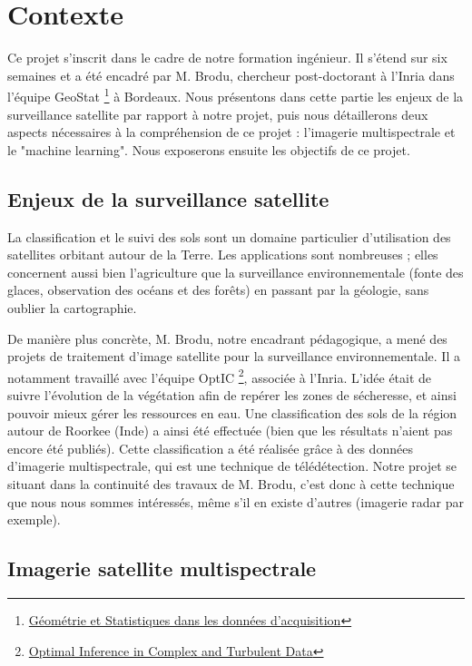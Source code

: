 
\section{Contexte}

Ce projet s'inscrit dans le cadre de notre formation ingénieur. Il s'étend sur six semaines et a été encadré par M. Brodu, chercheur post-doctorant à l'Inria dans l'équipe GeoStat \footnote{\href{https://geostat.bordeaux.inria.fr/}{Géométrie et Statistiques dans les données d'acquisition}} à Bordeaux. Nous présentons dans cette partie les enjeux de la surveillance satellite par rapport à notre projet, puis nous détaillerons deux aspects nécessaires à la compréhension de ce projet : l'imagerie multispectrale et le "machine learning". Nous exposerons ensuite les objectifs de ce projet. 

\subsection{Enjeux de la surveillance satellite}
 
La classification et le suivi des sols sont un domaine particulier d'utilisation des satellites orbitant autour de la Terre. 
Les applications sont nombreuses ; elles concernent aussi bien l'agriculture que la surveillance environnementale (fonte des glaces, observation des océans et des forêts) en passant par la géologie, sans oublier la cartographie.

De manière plus concrète, M. Brodu, notre encadrant pédagogique, a mené des projets de traitement d'image satellite pour la surveillance environnementale. Il a notamment travaillé avec l'équipe OptIC \footnote{\href{https://optic.bordeaux.inria.fr/}{Optimal Inference in Complex and Turbulent Data}}, associée à l'Inria. L'idée était de suivre l'évolution de la végétation afin de repérer les zones de sécheresse, et ainsi pouvoir mieux gérer les ressources en eau. Une classification des sols de la région autour de Roorkee (Inde) a ainsi été effectuée (bien que les résultats n'aient pas encore été publiés). 
Cette classification a été réalisée grâce à des données d'imagerie multispectrale, qui est une technique de télédétection. Notre projet se situant dans la continuité des travaux de M. Brodu, c'est donc à cette technique que nous nous sommes intéressés, même s'il en existe d'autres (imagerie radar par exemple). 

\subsection{Imagerie satellite multispectrale}

